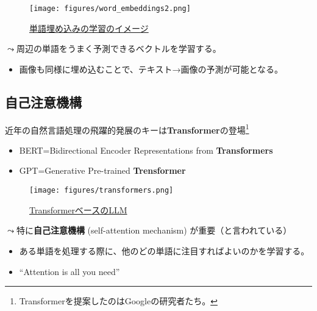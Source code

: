 \documentclass[
  xelatex,
  ja=standard]{bxjsarticle}
\providecommand{\tightlist}{%
  \setlength{\itemsep}{0pt}\setlength{\parskip}{0pt}}\usepackage{longtable,booktabs,array}
\begin{document}
\begin{figure}[htpb]

{\centering \texttt{[image: figures/word\_embeddings2.png]}

}

\caption{\href{https://ainow.ai/2021/04/08/254071/}{単語埋め込みの学習のイメージ}}

\end{figure}

\(\leadsto\)周辺の単語をうまく予測できるベクトルを学習する。

\begin{itemize}
\tightlist
\item
  画像も同様に埋め込むことで、テキスト→画像の予測が可能となる。
\end{itemize}

\hypertarget{ux81eaux5df1ux6ce8ux610fux6a5fux69cb}{%
\subsection{自己注意機構}\label{ux81eaux5df1ux6ce8ux610fux6a5fux69cb}}

近年の自然言語処理の飛躍的発展のキーは\textbf{Transformer}\citep{vaswani2017}の登場\footnote{Transformerを提案したのはGoogleの研究者たち。}

\begin{itemize}
\tightlist
\item
  BERT=Bidirectional Encoder Representations from \textbf{Transformers}
\item
  GPT=Generative Pre-trained \textbf{Trensformer}
\end{itemize}

\begin{figure}[htpb]

{\centering \texttt{[image: figures/transformers.png]}

}

\caption{\href{https://huggingface.co/learn/nlp-course/ja/chapter1/4?}{TransformerベースのLLM}}

\end{figure}

\(\leadsto\)特に\textbf{自己注意機構} (self-attention mechanism)
が重要（と言われている）

\begin{itemize}
\tightlist
\item
  ある単語を処理する際に、他のどの単語に注目すればよいのかを学習する。
\item
  ``Attention is all you need''\citep{vaswani2017}
\end{itemize}
\end{document}
